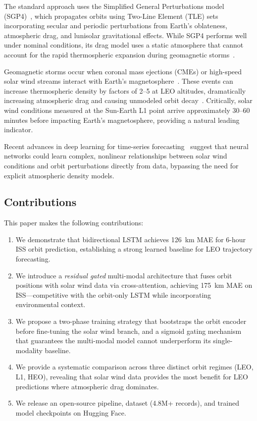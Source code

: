 \documentclass[twocolumn]{article}
\begin{document}
The standard approach uses the Simplified General Perturbations model
(SGP4)~\citep{vallado2006revisiting}, which propagates orbits using
Two-Line Element (TLE) sets incorporating secular and periodic
perturbations from Earth's oblateness, atmospheric drag, and lunisolar
gravitational effects. While SGP4 performs well under nominal conditions,
its drag model uses a static atmosphere that cannot account for the
rapid thermospheric expansion during geomagnetic storms~\citep{bruinsma2004thermosphere}.

Geomagnetic storms occur when coronal mass ejections (CMEs) or
high-speed solar wind streams interact with Earth's
magnetosphere~\citep{gonzalez1994geomagnetic}. These events can increase
thermospheric density by factors of 2--5 at LEO altitudes, dramatically
increasing atmospheric drag and causing unmodeled orbit
decay~\citep{sutton2018thermospheric}. Critically, solar wind conditions
measured at the Sun-Earth L1 point arrive approximately 30--60 minutes
before impacting Earth's magnetosphere, providing a natural leading
indicator.

Recent advances in deep learning for time-series
forecasting~\citep{zhou2021informer} suggest that neural networks could
learn complex, nonlinear relationships between solar wind conditions and
orbit perturbations directly from data, bypassing the need for explicit
atmospheric density models.

\subsection{Contributions}

This paper makes the following contributions:

\begin{enumerate}
  \item We demonstrate that bidirectional LSTM achieves 126~km MAE for
    6-hour ISS orbit prediction, establishing a strong learned baseline
    for LEO trajectory forecasting.
  \item We introduce a \emph{residual gated} multi-modal architecture
    that fuses orbit positions with solar wind data via cross-attention,
    achieving 175~km MAE on ISS---competitive with the orbit-only LSTM
    while incorporating environmental context.
  \item We propose a two-phase training strategy that bootstraps the
    orbit encoder before fine-tuning the solar wind branch, and a
    sigmoid gating mechanism that guarantees the multi-modal model
    cannot underperform its single-modality baseline.
  \item We provide a systematic comparison across three distinct orbit
    regimes (LEO, L1, HEO), revealing that solar wind data provides the
    most benefit for LEO predictions where atmospheric drag dominates.
  \item We release an open-source pipeline, dataset (4.8M+ records), and
    trained model checkpoints on Hugging Face.
\end{enumerate}
\end{document}
